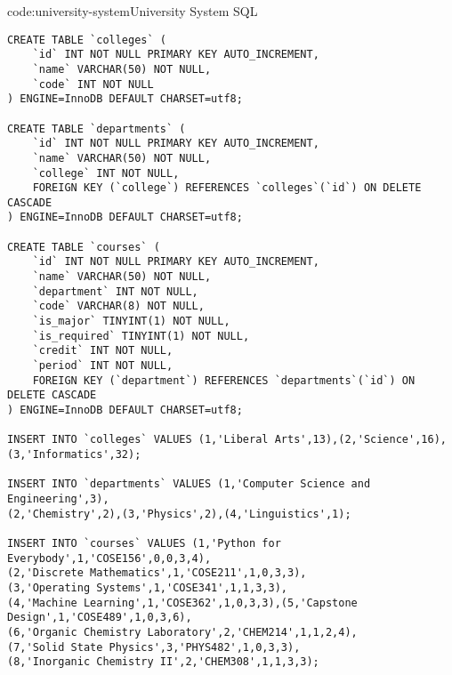 \begin{codeenv}{code:university-system}{University System SQL}\begin{verbatim}
CREATE TABLE `colleges` (
    `id` INT NOT NULL PRIMARY KEY AUTO_INCREMENT,
    `name` VARCHAR(50) NOT NULL,
    `code` INT NOT NULL
) ENGINE=InnoDB DEFAULT CHARSET=utf8;

CREATE TABLE `departments` (
    `id` INT NOT NULL PRIMARY KEY AUTO_INCREMENT,
    `name` VARCHAR(50) NOT NULL,
    `college` INT NOT NULL,
    FOREIGN KEY (`college`) REFERENCES `colleges`(`id`) ON DELETE CASCADE
) ENGINE=InnoDB DEFAULT CHARSET=utf8;

CREATE TABLE `courses` (
    `id` INT NOT NULL PRIMARY KEY AUTO_INCREMENT,
    `name` VARCHAR(50) NOT NULL,
    `department` INT NOT NULL,
    `code` VARCHAR(8) NOT NULL,
    `is_major` TINYINT(1) NOT NULL,
    `is_required` TINYINT(1) NOT NULL,
    `credit` INT NOT NULL,
    `period` INT NOT NULL,
    FOREIGN KEY (`department`) REFERENCES `departments`(`id`) ON DELETE CASCADE
) ENGINE=InnoDB DEFAULT CHARSET=utf8;

INSERT INTO `colleges` VALUES (1,'Liberal Arts',13),(2,'Science',16),
(3,'Informatics',32);

INSERT INTO `departments` VALUES (1,'Computer Science and Engineering',3),
(2,'Chemistry',2),(3,'Physics',2),(4,'Linguistics',1);

INSERT INTO `courses` VALUES (1,'Python for Everybody',1,'COSE156',0,0,3,4),
(2,'Discrete Mathematics',1,'COSE211',1,0,3,3),
(3,'Operating Systems',1,'COSE341',1,1,3,3),
(4,'Machine Learning',1,'COSE362',1,0,3,3),(5,'Capstone Design',1,'COSE489',1,0,3,6),
(6,'Organic Chemistry Laboratory',2,'CHEM214',1,1,2,4),
(7,'Solid State Physics',3,'PHYS482',1,0,3,3),
(8,'Inorganic Chemistry II',2,'CHEM308',1,1,3,3);
\end{verbatim}
\end{codeenv}

